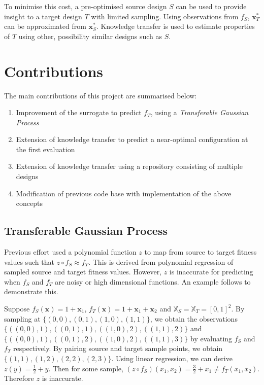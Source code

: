 \documentclass[10pt,a4paper]{article}
\begin{document}
To minimise this cost, a pre-optimised source design $S$ can be used to provide insight to a target design $T$ with limited sampling. Using observations from $f_S$, $\mathbf{x}_T^*$ can be approximated from $\mathbf{x}_S^*$. Knowledge transfer is used to estimate properties of $T$ using other, possibility similar designs such as $S$.

\section{Contributions}

The main contributions of this project are summarised below:
\begin{enumerate}
\item Improvement of the surrogate to predict $f_T$, using a \emph{Transferable Gaussian Process}
\item Extension of knowledge transfer to predict a near-optimal configuration at the first evaluation
\item Extension of knowledge transfer using a repository consisting of multiple designs
\item Modification of previous code base\cite{Nicholson2015} with implementation of the above concepts
\end{enumerate}
\subsection{Transferable Gaussian Process}

Previous effort\cite{Kurek2016} used a polynomial function $z$ to map from source to target fitness values such that $z\circ f_S\approx f_T$. This is derived from polynomial regression of sampled source and target fitness values. However, $z$ is inaccurate for predicting when $f_S$ and $f_T$ are noisy or high dimensional functions. An example follows to demonstrate this.

Suppose $f_S(\mathbf{x})=1+\mathbf{x}_1$, $f_T(\mathbf{x})=1+\mathbf{x}_1+\mathbf{x}_2$ and $\mathbb{X}_S=\mathbb{X}_T=[0,1]^2$. By sampling at $\{(0,0),(0,1),(1,0),(1,1)\}$, we obtain the observations $\{((0,0),1),\allowbreak((0,1),1),\allowbreak((1,0),2),((1,1),2)\}$ and $\{((0,0),1),((0,1),2),((1,0),2),((1,1),3)\}$ by evaluating $f_S$ and $f_T$ respectively. By pairing source and target sample points, we obtain $\{(1,1),(1,2),(2,2),(2,3)\}$. Using linear regression, we can derive $z(y)=\frac{1}{2}+y$. Then for some sample, $(z\circ f_S)(x_1,x_2)=\frac{3}{2}+x_1\not=f_T(x_1,x_2)$. Therefore $z$ is inaccurate.
\end{document}
